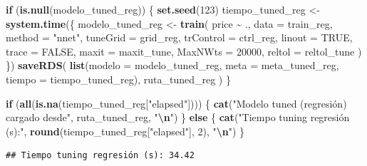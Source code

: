 \documentclass[
]{article}
\newenvironment{Shaded}{\begin{snugshade}}{\end{snugshade}}
\newcommand{\AttributeTok}[1]{\textcolor[rgb]{0.13,0.29,0.53}{#1}}
\newcommand{\ConstantTok}[1]{\textcolor[rgb]{0.56,0.35,0.01}{#1}}
\newcommand{\ControlFlowTok}[1]{\textcolor[rgb]{0.13,0.29,0.53}{\textbf{#1}}}
\newcommand{\DecValTok}[1]{\textcolor[rgb]{0.00,0.00,0.81}{#1}}
\newcommand{\FunctionTok}[1]{\textcolor[rgb]{0.13,0.29,0.53}{\textbf{#1}}}
\newcommand{\NormalTok}[1]{#1}
\newcommand{\OtherTok}[1]{\textcolor[rgb]{0.56,0.35,0.01}{#1}}
\newcommand{\SpecialCharTok}[1]{\textcolor[rgb]{0.81,0.36,0.00}{\textbf{#1}}}
\newcommand{\StringTok}[1]{\textcolor[rgb]{0.31,0.60,0.02}{#1}}
\begin{document}
\begin{Shaded}
\begin{Highlighting}[]
\ControlFlowTok{if}\NormalTok{ (}\FunctionTok{is.null}\NormalTok{(modelo\_tuned\_reg)) \{}
  \FunctionTok{set.seed}\NormalTok{(}\DecValTok{123}\NormalTok{)}
\NormalTok{  tiempo\_tuned\_reg }\OtherTok{\textless{}{-}} \FunctionTok{system.time}\NormalTok{(\{}
\NormalTok{    modelo\_tuned\_reg }\OtherTok{\textless{}{-}} \FunctionTok{train}\NormalTok{(}
\NormalTok{      price }\SpecialCharTok{\textasciitilde{}}\NormalTok{ .,}
      \AttributeTok{data      =}\NormalTok{ train\_reg,}
      \AttributeTok{method    =} \StringTok{"nnet"}\NormalTok{,}
      \AttributeTok{tuneGrid  =}\NormalTok{ grid\_reg,}
      \AttributeTok{trControl =}\NormalTok{ ctrl\_reg,}
      \AttributeTok{linout    =} \ConstantTok{TRUE}\NormalTok{,}
      \AttributeTok{trace     =} \ConstantTok{FALSE}\NormalTok{,}
      \AttributeTok{maxit     =}\NormalTok{ maxit\_tune,}
      \AttributeTok{MaxNWts   =} \DecValTok{20000}\NormalTok{,}
      \AttributeTok{reltol    =}\NormalTok{ reltol\_tune}
\NormalTok{    )}
\NormalTok{  \})}
  \FunctionTok{saveRDS}\NormalTok{(}
    \FunctionTok{list}\NormalTok{(}\AttributeTok{modelo =}\NormalTok{ modelo\_tuned\_reg, }\AttributeTok{meta =}\NormalTok{ meta\_tuned\_reg, }\AttributeTok{tiempo =}\NormalTok{ tiempo\_tuned\_reg),}
\NormalTok{    ruta\_tuned\_reg}
\NormalTok{  )}
\NormalTok{\}}

\ControlFlowTok{if}\NormalTok{ (}\FunctionTok{all}\NormalTok{(}\FunctionTok{is.na}\NormalTok{(tiempo\_tuned\_reg[}\StringTok{"elapsed"}\NormalTok{]))) \{}
  \FunctionTok{cat}\NormalTok{(}\StringTok{"Modelo tuned (regresión) cargado desde"}\NormalTok{, ruta\_tuned\_reg, }\StringTok{"}\SpecialCharTok{\textbackslash{}n}\StringTok{"}\NormalTok{)}
\NormalTok{\} }\ControlFlowTok{else}\NormalTok{ \{}
  \FunctionTok{cat}\NormalTok{(}\StringTok{"Tiempo tuning regresión (s):"}\NormalTok{, }\FunctionTok{round}\NormalTok{(tiempo\_tuned\_reg[}\StringTok{"elapsed"}\NormalTok{], }\DecValTok{2}\NormalTok{), }\StringTok{"}\SpecialCharTok{\textbackslash{}n}\StringTok{"}\NormalTok{)}
\NormalTok{\}}
\end{Highlighting}
\end{Shaded}

\begin{verbatim}
## Tiempo tuning regresión (s): 34.42
\end{verbatim}
\end{document}

